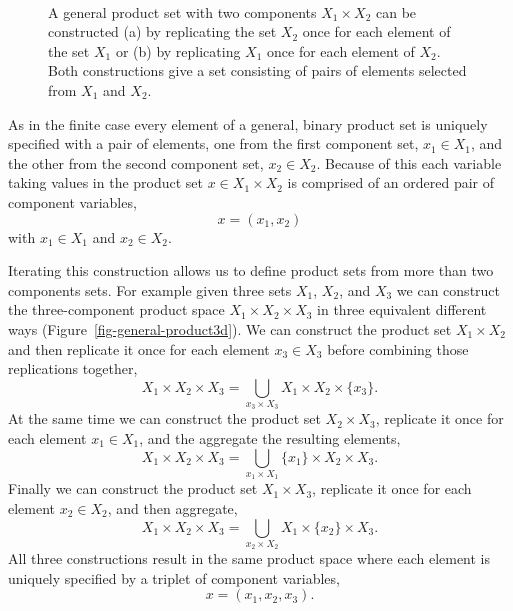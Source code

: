 \documentclass[
  letterpaper,
  DIV=11,
  numbers=noendperiod]{scrartcl}
\begin{document}
\begin{figure}
\begin{minipage}[t]{0.90\linewidth}
{{}

}

\subcaption{\label{fig-general-product2d-1}}
\end{minipage}%
%
\begin{minipage}[t]{0.05\linewidth}

{\centering 

~

}

\end{minipage}%

\caption{\label{fig-general-product2d}A general product set with two
components \(X_{1} \times X_{2}\) can be constructed (a) by replicating
the set \(X_{2}\) once for each element of the set \(X_{1}\) or (b) by
replicating \(X_{1}\) once for each element of \(X_{2}\). Both
constructions give a set consisting of pairs of elements selected from
\(X_{1}\) and \(X_{2}\).}

\end{figure}

As in the finite case every element of a general, binary product set is
uniquely specified with a pair of elements, one from the first component
set, \(x_{1} \in X_{1}\), and the other from the second component set,
\(x_{2} \in X_{2}\). Because of this each variable taking values in the
product set \(x \in X_{1} \times X_{2}\) is comprised of an ordered pair
of component variables, \[
x = ( x_{1}, x_{2} )
\] with \(x_{1} \in X_{1}\) and \(x_{2} \in X_{2}\).

Iterating this construction allows us to define product sets from more
than two components sets. For example given three sets \(X_{1}\),
\(X_{2}\), and \(X_{3}\) we can construct the three-component product
space \(X_{1} \times X_{2} \times X_{3}\) in three equivalent different
ways (Figure~\ref{fig-general-product3d}). We can construct the product
set \(X_{1} \times X_{2}\) and then replicate it once for each element
\(x_{3} \in X_{3}\) before combining those replications together, \[
X_{1} \times X_{2} \times X_{3}
=
\bigcup_{ x_{3} \times X_{3} } X_{1} \times X_{2} \times \{ x_{3} \}.
\] At the same time we can construct the product set
\(X_{2} \times X_{3}\), replicate it once for each element
\(x_{1} \in X_{1}\), and the aggregate the resulting elements, \[
X_{1} \times X_{2} \times X_{3}
=
\bigcup_{ x_{1} \times X_{1} } \{ x_{1} \} \times X_{2} \times X_{3}.
\] Finally we can construct the product set \(X_{1} \times X_{3}\),
replicate it once for each element \(x_{2} \in X_{2}\), and then
aggregate, \[
X_{1} \times X_{2} \times X_{3}
=
\bigcup_{ x_{2} \times X_{2} } X_{1} \times \{ x_{2} \} \times X_{3}.
\] All three constructions result in the same product space where each
element is uniquely specified by a triplet of component variables, \[
x = (x_{1}, x_{2}, x_{3}).
\]
\end{document}
